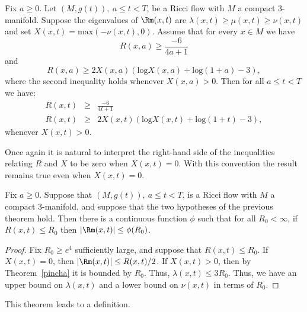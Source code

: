 \begin{theorem}
\label{thm:pinching-persists-from-time-a}
\label{pincha}
Fix $a\ge 0$. Let $(M,g(t)),\ a\le t<T$, be a Ricci flow with $M$ a
compact $3$-manifold. Suppose the eigenvalues of $\Rm(x,t)$ are
$\lambda(x,t)\ge \mu(x,t)\ge \nu(x,t)$ and set $X(x,t)=\mathrm{max}(-\nu(x,t),0)$. Assume that for every $x\in M$ we have
$$R(x,a) \ge  \frac{-6}{4a+1}$$
and $$ R(x,a) \geq 2X(x,a)\left(\mathrm{log}X(x,a)+\mathrm{log}(1+a)-3\right),$$ where the second inequality holds whenever
$X(x,a)>0$. Then for all $a\le t<T$ we have:
\begin{eqnarray}\label{Rlower}
R(x,t) & \ge & \frac{-6}{4t+1} \\\label{RXineq} R(x,t) & \geq &
2X(x,t)\left(\mathrm{log}X(x,t)+\mathrm{log}(1+t)-3\right),
\end{eqnarray}
whenever  $X(x,t)> 0$.
\end{theorem}

Once again it is natural to interpret the right-hand side of the
inequalities relating $R$ and $X$  to be zero when $X(x,t)=0$. With
this convention the result remains true even when $X(x,t)=0$.


\begin{corollary}
\label{cor:curvature-bound-from-scalar-pinching}
Fix $a\ge 0$. Suppose that $(M,g(t)),\ a\le t<T$, is a Ricci flow with $M$ a
compact $3$-manifold, and suppose that the two hypotheses of the previous
theorem hold. Then there is a continuous function $\phi$ such that for all
$R_0<\infty$, if $R(x,t)\le R_0$ then $|\Rm(x,t)|\le \phi(R_0)$.
\end{corollary}


\begin{proof}
Fix $R_0\ge e^4$ sufficiently large, and suppose that $R(x,t)\le
R_0$. If $X(x,t)=0$, then $|\Rm(x,t)|\le R(x,t)/2$. If
$X(x,t)>0$, then by Theorem~\ref{pincha} it is bounded by $R_0$.
Thus, $\lambda(x,t)\le 3R_0$. Thus, we have an upper bound on
$\lambda(x,t)$ and a lower bound on $\nu(x,t)$ in terms of $R_0$.
\end{proof}

This theorem leads to a definition.

